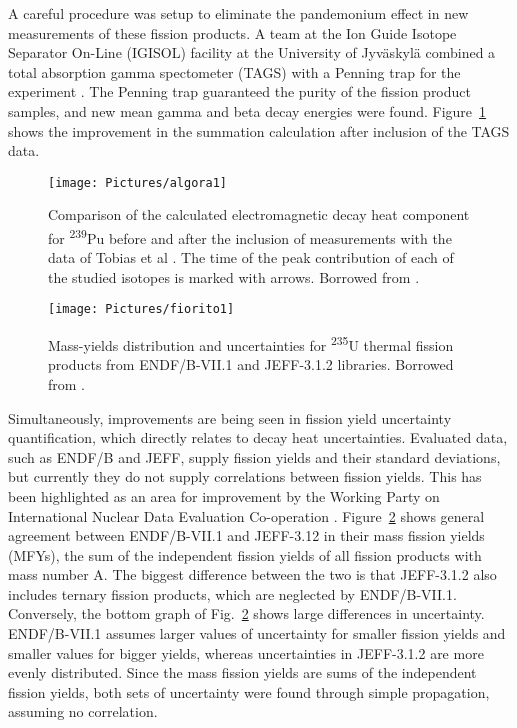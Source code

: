 \documentclass{anstrans}
\begin{document}
A careful procedure was setup to eliminate the pandemonium effect in new measurements of these fission products. A team at the Ion Guide Isotope Separator On-Line (IGISOL) facility at the University of Jyv\"{a}skyl\"{a} combined a total absorption gamma spectometer (TAGS) with a Penning trap for the experiment \cite{Algo2014}. The Penning trap guaranteed the purity of the fission product samples, and new mean gamma and beta decay energies were found. Figure~\ref{fig:algo1} shows the improvement in the summation calculation after inclusion of the TAGS data. 
\begin{figure}[ht]
 \centering
 \texttt{[image: Pictures/algora1]}
 \caption{Comparison of the calculated electromagnetic decay heat component for \textsuperscript{239}Pu before and after the inclusion of measurements with the data of Tobias et al \cite{Tobi1989}. The time of the peak contribution of each of the studied isotopes is marked with arrows. Borrowed from \cite{Algo2014}.}
 \label{fig:algo1}
\end{figure}

\begin{figure}[ht]
 \centering
 \texttt{[image: Pictures/fiorito1]}
 \caption{Mass-yields distribution and uncertainties for \textsuperscript{235}U thermal fission products from ENDF/B-VII.1 and JEFF-3.1.2 libraries. Borrowed from \cite{Fior2014}.}
 \label{fig:fior1}
\end{figure}
Simultaneously, improvements are being seen in fission yield uncertainty quantification, which directly relates to decay heat uncertainties. Evaluated data, such as ENDF/B and JEFF, supply fission yields and their standard deviations, but currently they do not supply correlations between fission yields. This has been highlighted as an area for improvement by the Working Party on International Nuclear Data Evaluation Co-operation \cite{Fior2014}. Figure~\ref{fig:fior1} shows general agreement between ENDF/B-VII.1 and JEFF-3.12 in their mass fission yields (MFYs), the sum of the independent fission yields of all fission products with mass number A. The biggest difference between the two is that JEFF-3.1.2 also includes ternary fission products, which are neglected by ENDF/B-VII.1. Conversely, the bottom graph of Fig.~\ref{fig:fior1} shows large differences in uncertainty. ENDF/B-VII.1 assumes larger values of uncertainty for smaller fission yields and smaller values for bigger yields, whereas uncertainties in JEFF-3.1.2 are more evenly distributed. Since the mass fission yields are sums of the independent fission yields, both sets of uncertainty were found through simple propagation, assuming no correlation. 
\end{document}
